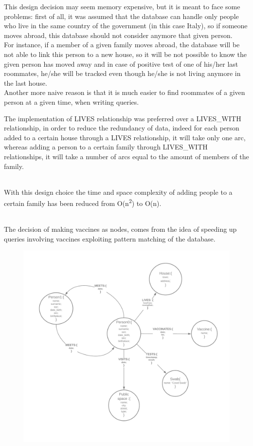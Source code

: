\documentclass{article}
\begin{document}
This design decision may seem memory expensive, but it is meant to face some problems: first of all, it was assumed that the database
can handle only people who live in the same country of the government (in this case Italy), so if someone moves abroad, this database should not consider anymore that given person.
\\For instance, if a member of a given family moves abroad, the database
will be not able to link this person to a new house, so it will be not possible to know the given person has moved away and in
case of positive test of one of his/her last roommates, he/she will be tracked even though he/she is not living anymore in the last house.
\\Another more naive reason is that it is much easier to find roommates of a given person at a given time, when writing queries.

The implementation of LIVES relationship was preferred over a LIVES\_WITH relationship, in order to
reduce the redundancy of data, indeed for each person added to a certain house through a LIVES relationship,
it will take only one arc, whereas adding a person to a certain family through LIVES\_WITH relationships, it will take a number of arcs equal to the amount of members of the family.

\\With this design choice the time and space complexity of adding people to a certain family has been reduced
from O(n\textsuperscript{2}) to O(n).

\\The decision of making vaccines as nodes, comes from the idea of speeding up queries involving vaccines
exploiting pattern matching of the database.

\begin{figure}
\centering
\includegraphics[scale=0.15]{Graph_diagram.png}
\end{figure}
\end{document}

